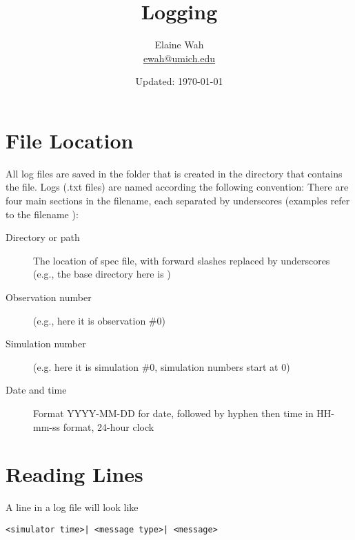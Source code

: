 \documentclass[11pt]{article}
\begin{document}
	
\title{Logging}
\author{
  Elaine Wah \\
  \href{mailto:ewah@umich.edu}{ewah@umich.edu}
}
\date{Updated: \today}
\maketitle

\section{File Location}

All log files are saved in the folder  that is created in the
directory that contains the  file.  Logs (.txt
files) are named according the following convention: There are four main sections in
the filename, each separated by underscores (examples refer to the filename
):

\begin{description}
\item[Directory or path] The location of spec file, with forward slashes replaced by
  underscores (e.g., the base directory here is )
\item[Observation number] (e.g., here it is observation \#0)
\item[Simulation number] (e.g. here it is simulation \#0, simulation numbers start at 0)
\item[Date and time] Format YYYY-MM-DD for date, followed by hyphen then time in HH-mm-ss format, 24-hour clock
\end{description}

\section{Reading Lines}

A line in a log file will look like

\begin{verbatim}
<simulator time>| <message type>| <message>
\end{verbatim}
\end{document}
